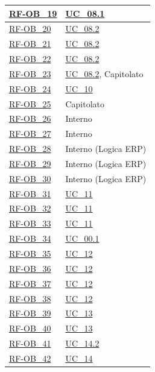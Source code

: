 \begin{longtable}{|>{\raggedright}p{}|>{\raggedright\arraybackslash}p{}|}
    \hyperlink{rf-ob_19}{RF-OB\_19} & \hyperref[uc_08.1]{UC\_08.1} \\ \hline
    \hyperlink{rf-ob_20}{RF-OB\_20} & \hyperref[uc_08.2]{UC\_08.2} \\ \hline
    \hyperlink{rf-ob_21}{RF-OB\_21} & \hyperref[uc_08.2]{UC\_08.2} \\ \hline
    \hyperlink{rf-ob_22}{RF-OB\_22} & \hyperref[uc_08.2]{UC\_08.2} \\ \hline
    \hyperlink{rf-ob_23}{RF-OB\_23} & \hyperref[uc_08.2]{UC\_08.2}, Capitolato \\ \hline
    \hyperlink{rf-ob_24}{RF-OB\_24} & \hyperref[uc_10]{UC\_10} \\ \hline
    \hyperlink{rf-ob_25}{RF-OB\_25} & Capitolato \\ \hline
    \hyperlink{rf-ob_26}{RF-OB\_26} & Interno \\ \hline
    \hyperlink{rf-ob_27}{RF-OB\_27} & Interno \\ \hline
    \hyperlink{rf-ob_28}{RF-OB\_28} & Interno (Logica ERP) \\ \hline
    \hyperlink{rf-ob_29}{RF-OB\_29} & Interno (Logica ERP) \\ \hline
    \hyperlink{rf-ob_30}{RF-OB\_30} & Interno (Logica ERP) \\ \hline
    \hyperlink{rf-ob_31}{RF-OB\_31} & \hyperref[uc_11]{UC\_11} \\ \hline
    \hyperlink{rf-ob_32}{RF-OB\_32} & \hyperref[uc_11]{UC\_11} \\ \hline
    \hyperlink{rf-ob_33}{RF-OB\_33} & \hyperref[uc_11]{UC\_11} \\ \hline
    \hyperlink{rf-ob_34}{RF-OB\_34} & \hyperref[uc_00.1]{UC\_00.1} \\ \hline
    \hyperlink{rf-ob_35}{RF-OB\_35} & \hyperref[uc_12]{UC\_12} \\ \hline
    \hyperlink{rf-ob_36}{RF-OB\_36} & \hyperref[uc_12]{UC\_12} \\ \hline
    \hyperlink{rf-ob_37}{RF-OB\_37} & \hyperref[uc_12]{UC\_12} \\ \hline
    \hyperlink{rf-ob_38}{RF-OB\_38} & \hyperref[uc_12]{UC\_12} \\ \hline
    \hyperlink{rf-ob_39}{RF-OB\_39} & \hyperref[uc_13]{UC\_13} \\ \hline
    \hyperlink{rf-ob_40}{RF-OB\_40} & \hyperref[uc_13]{UC\_13} \\ \hline
    \hyperlink{rf-ob_41}{RF-OB\_41} & \hyperref[uc_14.2]{UC\_14.2} \\ \hline
    \hyperlink{rf-ob_42}{RF-OB\_42} & \hyperref[uc_14]{UC\_14} \\ \hline

\end{longtable}
